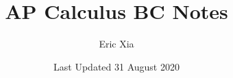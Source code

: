 \documentclass{article}
\title{AP Calculus BC Notes}
\author{Eric Xia}
\date{Last Updated 31 August 2020}
\begin{document}
    \maketitle
    \tableofcontents
    \pagebreak

\end{document}
